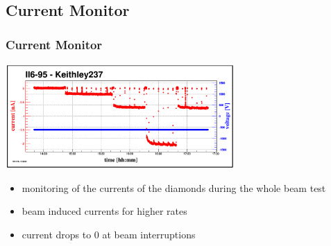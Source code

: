 \documentclass[9pt]{beamer}
\begin{document}
\subsection{Current Monitor}
\begin{frame}
	\frametitle{Current Monitor}
	\begin{center}
		\includegraphics[height=4cm]{Pics/currents}
	\end{center}
	\begin{itemize}
		\item monitoring of the currents of the diamonds during the whole beam test
		\item beam induced currents for higher rates
		\item current drops to 0 at beam interruptions
	\end{itemize}
\end{frame}
\end{document}

